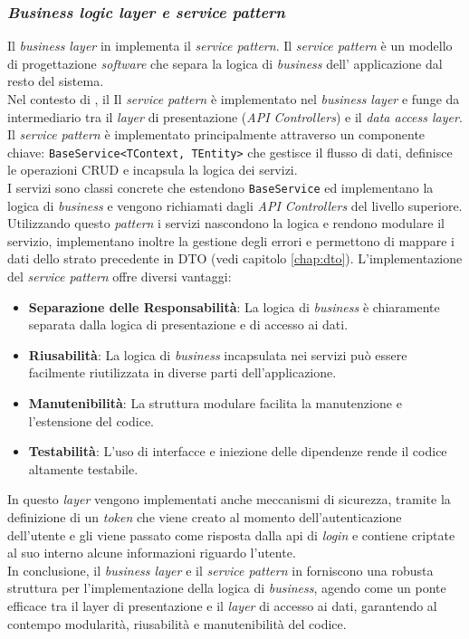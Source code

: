 \subsubsection{\textit{Business logic layer e service pattern}}
Il \textit{business layer} in {\movi} implementa il \textit{service pattern}.
Il \textit{service pattern} è un modello di progettazione \textit{software} che separa la logica di \textit{business} dell'
applicazione dal resto del sistema.\\
Nel contesto di {\movi}, il Il \textit{service pattern} è implementato nel \textit{business layer} 
e funge da intermediario tra il \textit{layer} di presentazione (\textit{API Controllers}) e il \textit{data access layer}.
Il \textit{service pattern} è implementato principalmente attraverso un componente chiave: \texttt{BaseService<TContext, TEntity>} 
che gestisce il flusso di dati, definisce le operazioni CRUD e incapsula la logica dei servizi.\\
I servizi sono classi concrete che estendono \texttt{BaseService} ed implementano la logica di \textit{business} 
e vengono richiamati dagli \textit{API Controllers} del livello superiore.
Utilizzando questo \textit{pattern} i servizi nascondono la logica e rendono modulare il servizio, implementano inoltre la gestione 
degli errori e permettono di mappare i dati dello strato precedente in DTO (vedi capitolo \ref{chap:dto}).
L'implementazione del \textit{service pattern} offre diversi vantaggi:
\begin{itemize}
\item \textbf{Separazione delle Responsabilità}: La logica di \textit{business} è chiaramente separata dalla logica di 
      presentazione e di accesso ai dati.
\item \textbf{Riusabilità}: La logica di \textit{business} incapsulata nei servizi può essere facilmente riutilizzata 
      in diverse parti dell'applicazione.
\item \textbf{Manutenibilità}: La struttura modulare facilita la manutenzione e l'estensione del codice.
\item \textbf{Testabilità}: L'uso di interfacce e iniezione delle dipendenze rende il codice altamente testabile.
\end{itemize}
In questo \textit{layer} vengono implementati anche meccanismi di sicurezza, tramite la definizione di un \textit{token} 
che viene creato al momento dell'autenticazione dell'utente e gli viene passato come risposta dalla \gls{api} di \textit{login} 
e contiene criptate al suo interno alcune informazioni riguardo l'utente.\\
In conclusione, il \textit{business layer} e il \textit{service pattern} in {\movi} forniscono una robusta struttura 
per l'implementazione della logica di \textit{business}, agendo come un ponte efficace tra il layer di presentazione e il 
\textit{layer} di accesso ai dati, garantendo al contempo modularità, riusabilità e manutenibilità del codice.